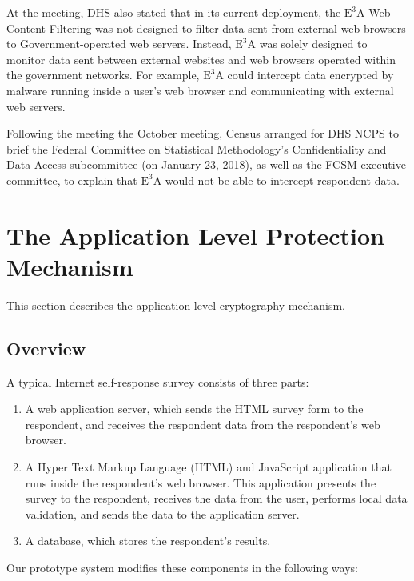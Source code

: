 \documentclass[fleqn,10pt]{wlscirep}
\newcommand{\ETA}{$\textrm{E}^\textrm{3}\textrm{A}$\xspace}
\begin{document}
At the meeting, DHS also stated that in its current deployment, the \ETA Web Content Filtering
was not designed to filter data sent from external web browsers to
Government-operated web servers. Instead, \ETA was solely designed to
monitor data sent between external websites and web browsers operated
within the government networks. For example, \ETA could intercept data
encrypted by malware running inside a user's web browser and
communicating with external web servers.

Following the meeting the October meeting, Census arranged for DHS
NCPS to brief the Federal Committee on Statistical Methodology's
Confidentiality and Data Access subcommittee (on January 23, 2018), as
well as the FCSM executive committee, to explain that \ETA would not
be able to intercept respondent data.

\section{The Application Level Protection Mechanism}

This section describes the application level cryptography mechanism.

\subsection{Overview}

A typical Internet self-response survey consists of three parts:

\begin{enumerate}
  \item A web application server, which sends the HTML survey form to
    the respondent, and receives the respondent data from the
    respondent's web browser.
  \item A Hyper Text Markup Language (HTML) and JavaScript application
    that runs inside the respondent's web browser. This application
    presents the survey to the respondent, receives the data from the user, performs
    local data validation, and sends the data to the application
    server.
  \item A database, which stores the respondent's results. 
\end{enumerate}

Our prototype system modifies these components in the following ways:
\end{document}
